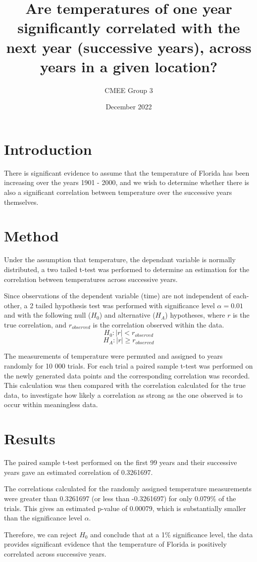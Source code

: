 \documentclass{article}
\title{Are temperatures of one year significantly correlated with the next year (successive years), across years in a given location?}
\author{CMEE Group 3 }
\date{December 2022}
\begin{document}
\maketitle

\section{Introduction}
There is significant evidence to assume that the temperature of Florida has been increasing over the years 1901 - 2000, and we wish to determine whether there is also a significant correlation between temperature over the successive years themselves.

\section{Method}
Under the assumption that temperature, the dependant variable is normally distributed, a  two tailed t-test was performed to determine an estimation for the correlation between temperatures across successive years. 

Since observations of the dependent variable (time) are not independent of each-other, a 2 tailed hypothesis test was performed with significance level $\alpha = 0.01$ and with the following null ($H_0$) and alternative ($H_A$) hypotheses, where $r$ is the true correlation, and $r_{observed}$ is the correlation observed within the data.
 \[ H_0: | r | <  r_{observed}\]
    \[H_A: |r| \geq r_{observed} \]

The measurements of temperature were permuted and assigned to years randomly for 10 000 trials. For each trial a paired sample t-test was performed on the newly generated data points and the corresponding correlation was recorded. This calculation was then compared with the correlation calculated for the true data, to investigate how likely a correlation as strong as the one observed is to occur within meaningless data.


\section{Results}
The paired sample t-test performed on the first 99 years and their successive years gave an estimated correlation of 0.3261697.

The correlations calculated for the randomly assigned temperature measurements were greater than 0.3261697 (or less than -0.3261697) for only 0.079\% of the trials. This gives an estimated p-value of 0.00079, which is substantially smaller than the significance level $\alpha$.

Therefore, we can reject $H_0$ and conclude that at a 1\% significance level, the data provides significant evidence that the temperature of Florida is positively correlated across successive years.
\end{document}
